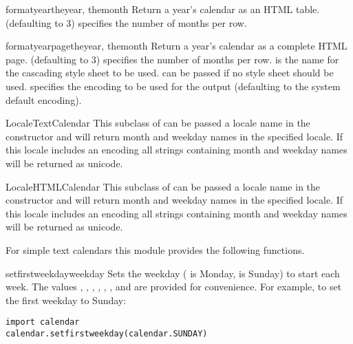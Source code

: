 \begin{methoddesc}{formatyear}{theyear, themonth}
Return a year's calendar as an HTML table.  (defaulting to 3)
specifies the number of months per row.
\end{methoddesc}

\begin{methoddesc}{formatyearpage}{theyear, themonth}
Return a year's calendar as a complete HTML page. 
(defaulting to 3) specifies the number of months per row. 
is the name for the cascading style sheet to be used. 
can be passed if no style sheet should be used. 
specifies the encoding to be used for the output (defaulting
to the system default encoding).
\end{methoddesc}


\begin{classdesc}{LocaleTextCalendar}{}
This subclass of  can be passed a locale name in the
constructor and will return month and weekday names in the specified locale.
If this locale includes an encoding all strings containing month and weekday
names will be returned as unicode.
\end{classdesc}


\begin{classdesc}{LocaleHTMLCalendar}{}
This subclass of  can be passed a locale name in the
constructor and will return month and weekday names in the specified locale.
If this locale includes an encoding all strings containing month and weekday
names will be returned as unicode.
\end{classdesc}


For simple text calendars this module provides the following functions.

\begin{funcdesc}{setfirstweekday}{weekday}
Sets the weekday ( is Monday,  is Sunday) to start
each week. The values , ,
, , ,
, and  are provided for
convenience. For example, to set the first weekday to Sunday:

\begin{verbatim}
import calendar
calendar.setfirstweekday(calendar.SUNDAY)
\end{verbatim}
\end{funcdesc}

